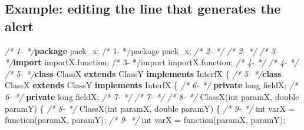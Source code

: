 \documentclass[
]{article}
\newenvironment{Shaded}{\begin{snugshade}}{\end{snugshade}}
\newcommand{\CommentTok}[1]{\textcolor[rgb]{0.56,0.35,0.01}{\textit{#1}}}
\newcommand{\DataTypeTok}[1]{\textcolor[rgb]{0.13,0.29,0.53}{#1}}
\newcommand{\FunctionTok}[1]{\textcolor[rgb]{0.00,0.00,0.00}{#1}}
\newcommand{\ImportTok}[1]{#1}
\newcommand{\KeywordTok}[1]{\textcolor[rgb]{0.13,0.29,0.53}{\textbf{#1}}}
\newcommand{\NormalTok}[1]{#1}
\begin{document}
\begin{landscape}

\subsection{Example: editing the line that generates the alert} \label{example_editing_line}

\small

\normalsize

\scriptsize

\begin{Shaded}
\begin{Highlighting}[]
\CommentTok{/*  1-   */}\KeywordTok{package}\ImportTok{ pack_x;                                          /*  1-   */package pack_x;}                                          
\CommentTok{/*  2-   */}                                                         \CommentTok{/*  2-   */}                                                         
\CommentTok{/*  3-   */}\KeywordTok{import}\ImportTok{ importX.function;                                 /*  3-   */import importX.function;}                                 
\CommentTok{/*  4-   */}                                                         \CommentTok{/*  4-   */}                                                         
\CommentTok{/*  5-   */}\KeywordTok{class}\NormalTok{ ClassX }\KeywordTok{extends}\NormalTok{ ClassY }\KeywordTok{implements}\NormalTok{ InterfX \{         }\CommentTok{/*  5-   */}\KeywordTok{class}\NormalTok{ ClassX }\KeywordTok{extends}\NormalTok{ ClassY }\KeywordTok{implements}\NormalTok{ InterfX \{         }
\CommentTok{/*  6-   */}    \KeywordTok{private} \DataTypeTok{long}\NormalTok{ fieldX;                                 }\CommentTok{/*  6-   */}    \KeywordTok{private} \DataTypeTok{long}\NormalTok{ fieldX;                                 }
\CommentTok{/*  7-   */}                                                         \CommentTok{/*  7-   */}                                                         
\CommentTok{/*  8-   */}    \FunctionTok{ClassX}\NormalTok{(}\DataTypeTok{int}\NormalTok{ paramX, }\DataTypeTok{double}\NormalTok{ paramY) \{                        }\CommentTok{/*  8-   */}    \FunctionTok{ClassX}\NormalTok{(}\DataTypeTok{int}\NormalTok{ paramX, }\DataTypeTok{double}\NormalTok{ paramY) \{                          }
\CommentTok{/*  9-   */}        \DataTypeTok{int}\NormalTok{ varX = }\FunctionTok{function}\NormalTok{(paramX, paramY);                  }\CommentTok{/*  9-   */}        \DataTypeTok{int}\NormalTok{ varX = }\FunctionTok{function}\NormalTok{(paramX, paramY);                     }

\end{Highlighting}
\end{Shaded}
\end{landscape}
\end{document}

